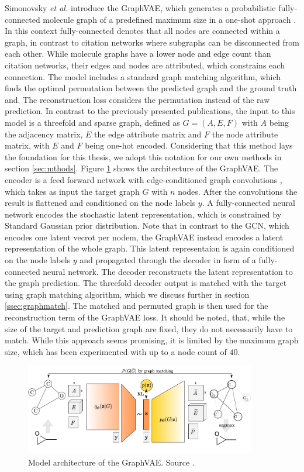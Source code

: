 Simonovsky \textit{et al.} introduce the GraphVAE, which generates a probabilistic fully-connected molecule graph of a predefined maximum size
in a one-shot approach \cite{simonovsky_graphvae_2018}. In this context fully-connected denotes that all nodes are connected within a graph, in contrast to citation networks where subgraphs can be disconnected from each other. While molecule graphs have a lower node and edge count than citation networks, their edges and nodes are attributed, which constrains each connection. The model includes a standard graph matching algorithm, which finds the optimal permutation between the predicted graph and the ground truth and. The reconstruction loss considers the permutation instead of the raw prediction. In contrast to the previously presented publications, the input to this model is a threefold and sparse graph, defined as $G=(A, E, F)$ with $A$ being the adjacency matrix, $E$ the edge attribute matrix and $F$ the node attribute matrix, with $E$ and $F$ being one-hot encoded. Considering that this method lays the foundation for this thesis, we adopt this notation for our own methods in section \ref{sec:mthods}. Figure \ref{fig:graphvaefull} shows the architecture of the GraphVAE. The encoder is a feed forward network with edge-conditioned graph convolutions \cite{simonovsky2017dynamic}, which takes as input the target graph $G$ with $n$ nodes. After the convolutions the result is flattened and conditioned on the node labels $y$. A fully-connected neural network encodes the stochastic latent representation, which is constrained by Standard Gaussian prior distribution. Note that in contrast to the GCN, which encodes one latent vecrot per nodem, the GraphVAE instead encodes a latent representation of the whole graph. This latent representaion is again conditioned on the node labels $y$ and propagated through the decoder in form of a fully-connected neural network. The decoder reconstructs the latent representation to the graph prediction. The threefold decoder output is matched with the target using graph matching algorithm, which we discuss further in section \ref{ssec:graphmatch}. The matched and permuted graph is then used for the reconstruction term of the GraphVAE loss. It should be noted, that, while the size of the target and prediction graph are fixed, they do not necessarily have to match. While this approach seems promising, it is limited by the maximum graph size, which has been experimented with up to a node count of $40$.


\begin{figure}[h]
    \centering
    \includegraphics[width=0.9\textwidth]{data/images/GraphVAEfull.png}
    \caption{Model architecture of the GraphVAE. Source \cite{simonovsky_graphvae_2018}.}
    \label{fig:graphvaefull}
\end{figure}

